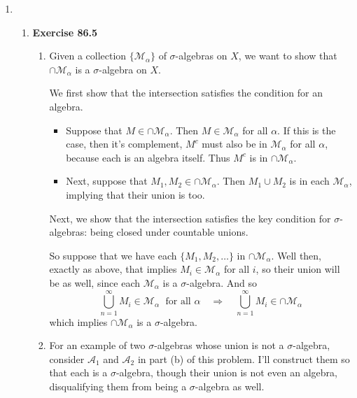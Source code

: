 \documentclass[12pt]{article}
\theoremstyle{plain}
\theoremstyle{definition}
\theoremstyle{remark}
\begin{document}
\begin{enumerate}
\item \begin{enumerate}
\item \textbf{Exercise 86.5}\begin{enumerate}
\item Given a collection $\{\mathscr{M}_\alpha\}$ of $\sigma$-algebras on $X$, we want to show that $\cap \mathscr{M}_\alpha$ is a $\sigma$-algebra on $X$. 
    
We first show that the intersection satisfies the condition for an algebra. 
\begin{itemize}
\item Suppose that $M \in \cap \mathscr{M}_\alpha$. Then $M\in \mathscr{M}_\alpha$ for all $\alpha$. If this is the case, then it's complement, $M^c$ must also be in $\mathscr{M}_\alpha$ for all $\alpha$, because each is an algebra itself. Thus $M^c$ is in $\cap \mathscr{M}_\alpha$. 

\item Next, suppose that $M_1, M_2 \in \cap \mathscr{M}_\alpha$. Then $M_1 \cup M_2$ is in each $\mathscr{M}_\alpha$, implying that their union is too.
\end{itemize}

Next, we show that the intersection satisfies the key condition for $\sigma$-algebras: being closed under countable unions. 

So suppose that we have each $\{M_1, M_2, \ldots\}$ in $\cap \mathscr{M}_\alpha$. Well then, exactly as above, that implies $M_i \in \mathscr{M}_\alpha$ for all $i$, so their union will be as well, since each $\mathscr{M}_\alpha$ is a $\sigma$-algebra. And so 
\[ 
    \bigcup^\infty_{n=1} M_i \in \mathscr{M}_\alpha \;
    \text{ for all $\alpha$} 
    \quad \Rightarrow\quad
    \bigcup^\infty_{n=1} M_i \in \cap\mathscr{M}_\alpha 
\]
which implies $\cap \mathscr{M}_\alpha$ is a $\sigma$-algebra.

\item For an example of two $\sigma$-algebras whose union is not a $\sigma$-algebra, consider $\mathscr{A}_1$ and $\mathscr{A}_2$ in part (b) of this problem. I'll construct them so that each is a $\sigma$-algebra, though their union is not even an algebra, disqualifying them from being a $\sigma$-algebra as well.

\end{enumerate}


\end{enumerate}
\end{enumerate}
\end{document}
